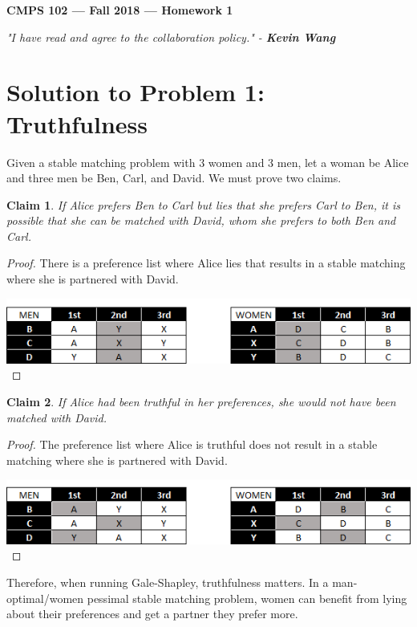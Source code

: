 \documentclass[11pt]{article}
\theoremstyle{definition}
\theoremstyle{plain}
\newtheorem{claim}{Claim}
\theoremstyle{indented-remark}
\theoremstyle{indented-proof}
\begin{document}
\begin{center}
{\bf\Large CMPS 102 --- Fall 2018 ---  Homework 1}
\end{center}

\begin{center}
\textit{"I have read and agree to the collaboration policy." - \textbf{Kevin Wang}}
\end{center}

\section*{Solution to Problem 1: Truthfulness}

Given a stable matching problem with 3 women and 3 men, let a woman be Alice and three men be Ben, Carl, and David. We must prove two claims.

\begin{claim} 
If Alice prefers Ben to Carl but lies that she prefers Carl to Ben, it is possible that she can be matched with David, whom she prefers to both Ben and Carl.
\end{claim}

\begin{proof} 
There is a preference list where Alice lies that results in a stable matching where she is partnered with David.

\includegraphics[scale=1]{images/fig1.png}
\end{proof}

\begin{claim} 
If Alice had been truthful in her preferences, she would not have been matched with David.
\end{claim}

\begin{proof}
The preference list where Alice is truthful does not result in a stable matching where she is partnered with David.

\includegraphics[scale=1]{images/fig2.png}
\end{proof}
\noindent Therefore, when running Gale-Shapley, truthfulness matters. In a man-optimal/women pessimal stable matching problem, women can benefit from lying about their preferences and get a partner they prefer more.
\end{document}

